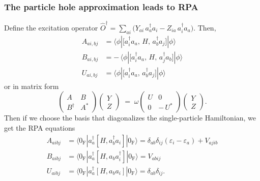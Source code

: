 \begin{frame}
    \frametitle{The particle hole approximation leads to RPA}
Define the excitation operator $
\hat O^\dagger
=\sum_{a i}\bigl(Y_{a i}\,a_a^\dagger a_i - Z_{i a}\,a_i^\dagger a_a\bigr).$ Then, 
\begin{align}
A_{ai,bj}
&=\langle\phi|\bigl[a_i^\dagger a_a,\,H,\,a_b^\dagger a_j\bigr]|\phi\rangle\\
B_{ai,bj}
&=-\,\langle\phi|\bigl[a_i^\dagger a_a,\,H,\,a_j^\dagger a_b\bigr]|\phi\rangle \\
U_{ai,bj}
&=\langle\phi|\bigl[a_i^\dagger a_a,\,a_b^\dagger a_j\bigr]|\phi\rangle
\end{align}
or in matrix form
\begin{equation}
\begin{pmatrix}
A & B \\[6pt]
B^\dagger & A^*
\end{pmatrix}
\begin{pmatrix}
Y \\ Z
\end{pmatrix}
\;=\;
\omega
\begin{pmatrix}
U & 0 \\[3pt]
0 & -\,U^*
\end{pmatrix}
\begin{pmatrix}
Y \\ Z
\end{pmatrix}.
\label{eq:block_matrix}
\end{equation}
Then if we choose the basis that diagonalizes the single-particle Hamiltonian, we get the RPA equations
\begin{align}
    A_{a i b j} &= \langle 0_{\mathrm{F}} | a_a^\dagger \left[H, a_b^\dagger a_i\right] | 0_{\mathrm{F}} \rangle = \delta_{a b} \delta_{i j}\left(\varepsilon_i-\varepsilon_a\right) + V_{a j i b} \\
    B_{a i b j} &= \langle 0_{\mathrm{F}} | a_a^\dagger \left[H, a_b a_i^\dagger\right] | 0_{\mathrm{F}} \rangle = V_{a b i j} \\
    U_{a i b j} &= \langle 0_{\mathrm{F}} | a_a^\dagger \left[H, a_b a_i\right] | 0_{\mathrm{F}} \rangle = \delta_{a b} \delta_{i j} .
\end{align}

\end{frame}
